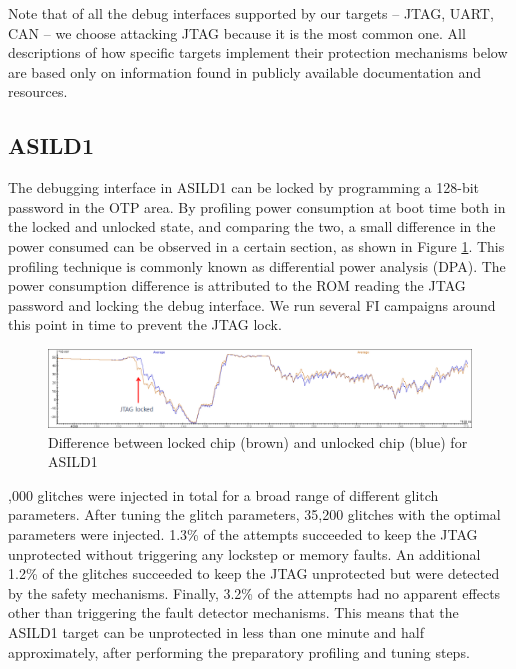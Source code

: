 \documentclass[10pt, conference, compsocconf]{IEEEtran}
\newcommand{\TI}{ASILD1\xspace}
\begin{document}
Note that of all the debug interfaces supported by our targets -- JTAG, UART, CAN -- we choose attacking JTAG because it is the most common one. All descriptions of how specific targets implement their protection mechanisms below are based only on information found in publicly available documentation and resources.

\subsection{\TI}
The debugging interface in \TI can be locked by programming a 128-bit password in the OTP area. By profiling power consumption at boot time both in the locked and unlocked state, and comparing the two, a small difference in the power consumed can be observed in a certain section, as shown in Figure \ref{fig:jtag-ti}. This profiling technique is commonly known as differential power analysis (DPA). The power consumption difference is attributed to the ROM reading the JTAG password and locking the debug interface. We run several FI campaigns around this point in time to prevent the JTAG lock.

\begin{figure}[!t]
  \centering
  \includegraphics[width=\textwidth]{tms570-DPA-jtag}
  \caption{Difference between locked chip (brown) and unlocked chip (blue) for \TI}
  \label{fig:jtag-ti}
\end{figure}

,000 glitches were injected in total for a broad range of different glitch parameters. After tuning the glitch parameters, 35,200 glitches with the optimal parameters were injected. 1.3\% of the attempts succeeded to keep the JTAG unprotected without triggering any lockstep or memory faults. An additional 1.2\% of the glitches succeeded to keep the JTAG unprotected but were detected by the safety mechanisms. Finally, 3.2\% of the attempts had no apparent effects other than triggering the fault detector mechanisms.
This means that the \TI target can be unprotected in less than one minute and half approximately, after performing the preparatory profiling and tuning steps. 
\end{document}
